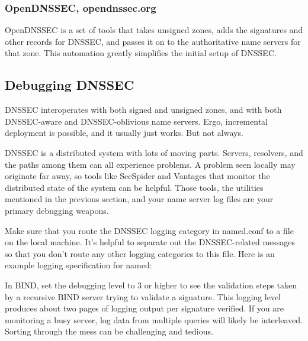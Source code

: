 \subsubsection[OpenDNSSEC,
opendnssec.org]{\texorpdfstring{\protect\hypertarget{part0024_split_067.htmlux5cux23_idTextAnchor952}{}{}OpenDNSSEC,
opendnssec.org}{OpenDNSSEC, opendnssec.org}}

OpenDNSSEC is a set of tools that takes unsigned zones, adds the
signatures and other records for DNSSEC, and passes it on to the
authoritative name servers for that zone. This automation greatly
simplifies the initial setup of DNSSEC.

\protect\hypertarget{part0024_split_068.html}{}{}

\hypertarget{part0024_split_068.htmlux5cux23_idContainer1069}{}
\hypertarget{part0024_split_068.htmlux5cux23calibre_pb_67}{%
\subsection[Debugging
DNSSEC]{\texorpdfstring{\protect\hypertarget{part0024_split_068.htmlux5cux23_idTextAnchor953}{}{}Debugging
DNSSEC}{Debugging DNSSEC}}\label{part0024_split_068.htmlux5cux23calibre_pb_67}}

DNSSEC interoperates with both signed and unsigned zones, and with both
DNSSEC-aware and DNSSEC-oblivious name servers. Ergo, incremental
deployment is possible, and it usually just works. But not always.

DNSSEC is a distributed system with lots of moving parts. Servers,
resolvers, and the paths among them can all experience problems. A
problem seen locally may originate far away, so tools like SecSpider and
Vantages that monitor the distributed state of the system can be
helpful. Those tools, the utilities mentioned in the previous section,
and your name server log files are your primary debugging weapons.

Make sure that you route the DNSSEC logging category in {named.conf }to
a file on the local machine. It's helpful to separate out the
DNSSEC-related messages so that you don't route any other logging
categories to this file. Here is an example logging specification for
{named}:


In BIND, set the debugging level to 3 or higher to see the validation
steps taken by a recursive BIND server trying to validate a signature.
This logging level produces about two pages of logging output per
signature verified. If you are monitoring a busy server, log data from
multiple queries will likely be interleaved. Sorting through the mess
can be challenging and tedious.

